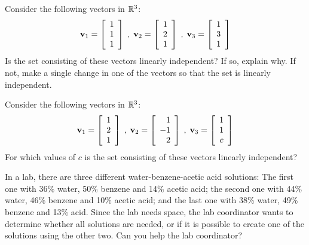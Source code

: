\label{sec:indep_exer}

\be

\item Consider the following vectors in $\mathbb{R}^3$:
\[ \mathbf{v}_1 = \left[ \begin{array}{c} 1 \\ 1\\ 1 \end{array} \right]\; , \; \mathbf{v}_2 = \left[ \begin{array}{c} 1 \\ 2\\ 1 \end{array} \right] \; , \; \mathbf{v}_3= \left[ \begin{array}{c} 1 \\ 3\\ 1 \end{array} \right] \]
Is the set consisting of these vectors linearly independent? If so, explain why. If not, make a single change in one of the vectors so that the set is linearly independent.\\

\item Consider the following vectors in $\mathbb{R}^3$:
\[ \mathbf{v}_1 = \left[ \begin{array}{c} 1 \\ 2\\ 1 \end{array} \right]\; , \; \mathbf{v}_2 = \left[ \begin{array}{r} 1 \\ -1\\ 2 \end{array} \right] \; , \; \mathbf{v}_3= \left[ \begin{array}{c} 1 \\ 1\\ c \end{array} \right] \]
For which values of $c$ is the set consisting of these vectors linearly independent?\\

\item In a lab, there are three different water-benzene-acetic acid solutions: The first one with 36\% water, 50\% benzene and 14\% acetic acid; the second one with 44\% water, 46\% benzene and 10\% acetic acid; and the last one with 38\% water, 49\% benzene and 13\% acid. Since the lab needs space, the lab coordinator wants to determine whether all solutions are needed, or if it is possible to create one of the solutions using the other two. Can you help the lab coordinator? 

